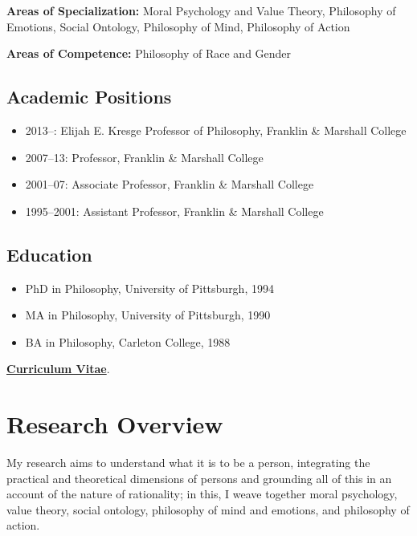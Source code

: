\documentclass[11pt]{article}
\begin{document}
\noindent\textbf{Areas of Specialization:}
Moral Psychology and Value Theory,
Philosophy of Emotions,
Social Ontology,
Philosophy of Mind,
Philosophy of Action

\noindent\textbf{Areas of Competence:}
Philosophy of Race and Gender

\subsection*{Academic Positions}

\begin{itemize}
  \item 2013--: Elijah E. Kresge Professor of Philosophy, Franklin \& {} Marshall College
  \item 2007--13: Professor, Franklin \& {} Marshall College
  \item 2001--07: Associate Professor, Franklin \& {} Marshall College
  \item 1995--2001: Assistant Professor, Franklin \& {} Marshall College
\end{itemize}

\subsection*{Education}

\begin{itemize}
  \item PhD in Philosophy, University of Pittsburgh, 1994
  \item MA in Philosophy, University of Pittsburgh, 1990
  \item BA in Philosophy, Carleton College, 1988
\end{itemize}

\noindent\href{https://drive.google.com/file/d/1-8fjo2F9EzgfDyYo_WSTYhaU-xrDNU8P/view}{\textbf{Curriculum Vitae}}.

\section[Research]{Research Overview}

My research aims to understand what it is to be a person, integrating the practical and theoretical dimensions of persons and grounding all of this in an account of the nature of rationality; in this, I weave together moral psychology, value theory, social ontology, philosophy of mind and emotions, and philosophy of action.
\end{document}
